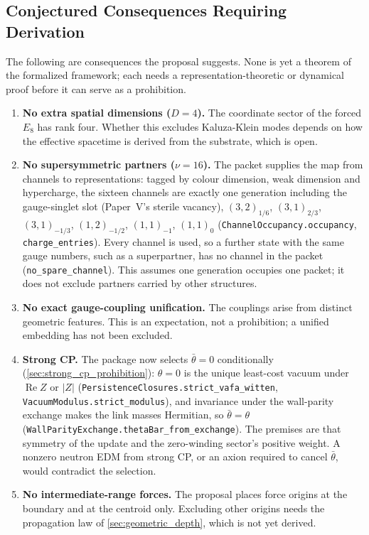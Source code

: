 \begin{enumerate}
\end{enumerate}

\subsection{Conjectured Consequences Requiring Derivation}

The following are consequences the proposal suggests. None is yet a theorem of the formalized framework; each needs a representation-theoretic or dynamical proof before it can serve as a prohibition.

\begin{enumerate}
    \item \textbf{No extra spatial dimensions ($D=4$).} The coordinate sector of the forced $E_8$ has rank four. Whether this excludes Kaluza-Klein modes depends on how the effective spacetime is derived from the substrate, which is open.
    \item \textbf{No supersymmetric partners ($\nu=16$).} The packet supplies the map from channels to representations: tagged by colour dimension, weak dimension and hypercharge, the sixteen channels are exactly one generation including the gauge-singlet slot (Paper~V's sterile vacancy), $(3,2)_{1/6}$, $(3,1)_{2/3}$, $(3,1)_{-1/3}$, $(1,2)_{-1/2}$, $(1,1)_{-1}$, $(1,1)_0$ (\texttt{ChannelOccupancy.occupancy}, \texttt{charge\_entries}). Every channel is used, so a further state with the same gauge numbers, such as a superpartner, has no channel in the packet (\texttt{no\_spare\_channel}). This assumes one generation occupies one packet; it does not exclude partners carried by other structures.
    \item \textbf{No exact gauge-coupling unification.} The couplings arise from distinct geometric features. This is an expectation, not a prohibition; a unified embedding has not been excluded.
    \item \textbf{Strong CP.} The package now selects $\bar\theta=0$ conditionally (\cref{sec:strong_cp_prohibition}): $\theta=0$ is the unique least-cost vacuum under $\operatorname{Re}Z$ or $|Z|$ (\texttt{PersistenceClosures.strict\_vafa\_witten}, \texttt{VacuumModulus.strict\_modulus}), and invariance under the wall-parity exchange makes the link masses Hermitian, so $\bar\theta=\theta$ (\texttt{WallParityExchange.thetaBar\_from\_exchange}). The premises are that symmetry of the update and the zero-winding sector's positive weight. A nonzero neutron EDM from strong CP, or an axion required to cancel $\bar\theta$, would contradict the selection.
    \item \textbf{No intermediate-range forces.} The proposal places force origins at the boundary and at the centroid only. Excluding other origins needs the propagation law of \cref{sec:geometric_depth}, which is not yet derived.
\end{enumerate}

